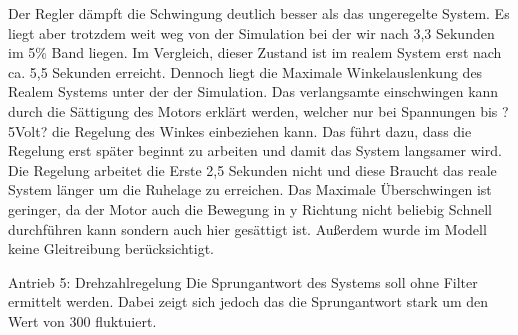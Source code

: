 \documentclass[10pt]{scrartcl}
\begin{document}
Der Regler dämpft die Schwingung deutlich besser als das ungeregelte System. Es liegt aber trotzdem weit weg von der Simulation bei der wir nach 3,3 Sekunden im 5\% Band liegen. Im Vergleich, dieser Zustand ist im realem System erst nach ca. 5,5 Sekunden erreicht. Dennoch liegt die Maximale Winkelauslenkung des Realem Systems unter der der Simulation. Das verlangsamte einschwingen kann durch die Sättigung des Motors erklärt werden, welcher nur bei Spannungen bis ?5Volt? die Regelung des Winkes einbeziehen kann. Das führt dazu, dass die Regelung erst später beginnt zu arbeiten und damit das System langsamer wird. Die Regelung arbeitet die Erste 2,5 Sekunden nicht und diese Braucht das reale System länger um die Ruhelage zu erreichen. Das Maximale Überschwingen ist geringer, da der Motor auch die Bewegung in y Richtung nicht beliebig Schnell durchführen kann sondern auch hier gesättigt ist. Außerdem wurde im Modell keine Gleitreibung berücksichtigt.

Antrieb 
5: Drehzahlregelung
	Die Sprungantwort des Systems soll ohne Filter ermittelt werden. Dabei zeigt sich jedoch das die Sprungantwort stark um den Wert von 300 fluktuiert.
 
\end{document}
